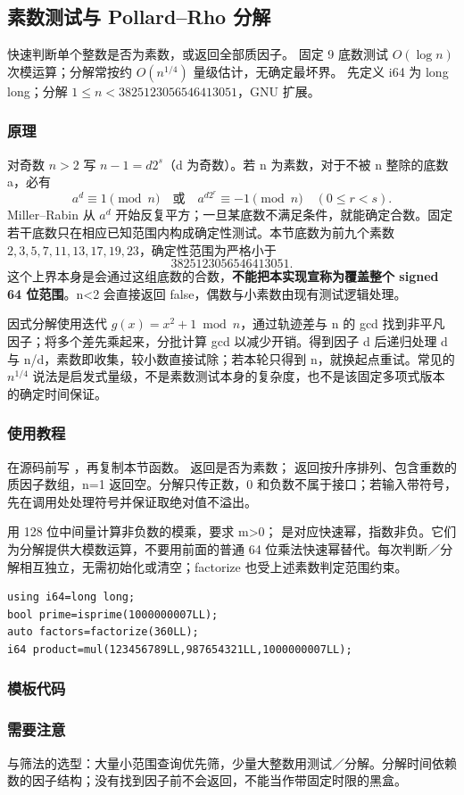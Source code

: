 \subsection{素数测试与 Pollard–Rho 分解}
\label{math:prime-test}
\AlgorithmInfo
    {快速判断单个整数是否为素数，或返回全部质因子。}
    {固定 9 底数测试 $O(\log n)$ 次模运算；分解常按约 $O(n^{1/4})$ 量级估计，无确定最坏界。}
    {先定义 i64 为 long long；分解 $1\le n<3825123056546413051$，GNU  扩展。}
\subsubsection*{原理}
对奇数 $n>2$ 写 $n-1=d2^s$（d 为奇数）。若 n 为素数，对于不被 n 整除的底数 a，必有
\[
 a^d\equiv1\pmod n\quad\text{或}\quad
 a^{d2^r}\equiv-1\pmod n\quad(0\le r<s).
\]
Miller–Rabin 从 $a^d$ 开始反复平方；一旦某底数不满足条件，就能确定合数。固定若干底数只在相应已知范围内构成确定性测试。本节底数为前九个素数 $2,3,5,7,11,13,17,19,23$，确定性范围为严格小于
\[
 3825123056546413051.
\]
这个上界本身是会通过这组底数的合数，\textbf{不能把本实现宣称为覆盖整个 signed 64 位范围}。n<2 会直接返回 false，偶数与小素数由现有测试逻辑处理。

因式分解使用迭代 $g(x)=x^2+1\bmod n$，通过轨迹差与 n 的 gcd 找到非平凡因子；将多个差先乘起来，分批计算 gcd 以减少开销。得到因子 d 后递归处理 d 与 n/d，素数即收集，较小数直接试除；若本轮只得到 n，就换起点重试。常见的 $n^{1/4}$ 说法是启发式量级，不是素数测试本身的复杂度，也不是该固定多项式版本的确定时间保证。
\subsubsection*{使用教程}
在源码前写 ，再复制本节函数。 返回是否为素数； 返回按升序排列、包含重数的质因子数组，n=1 返回空。分解只传正数，0 和负数不属于接口；若输入带符号，先在调用处处理符号并保证取绝对值不溢出。

 用 128 位中间量计算非负数的模乘，要求 m>0； 是对应快速幂，指数非负。它们为分解提供大模数运算，不要用前面的普通 64 位乘法快速幂替代。每次判断／分解相互独立，无需初始化或清空；factorize 也受上述素数判定范围约束。
\begin{lstlisting}[style=mtycpp,numbers=none]
using i64=long long;
bool prime=isprime(1000000007LL);
auto factors=factorize(360LL);
i64 product=mul(123456789LL,987654321LL,1000000007LL);
\end{lstlisting}
\subsubsection*{模板代码}
\subsubsection*{需要注意}
与筛法的选型：大量小范围查询优先筛，少量大整数用测试／分解。分解时间依赖数的因子结构；没有找到因子前不会返回，不能当作带固定时限的黑盒。
